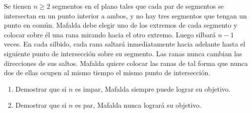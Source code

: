 Se tienen $n \ge 2$ segmentos en el plano tales que cada par de segmentos se intersectan en un punto interior a ambos, y no hay tres segmentos que tengan un punto en común. Mafalda debe elegir uno de los extremos de cada segmento y colocar sobre él una rana mirando hacia el otro extremo. Luego silbará $n-1$ veces. En cada silbido, cada rana saltará inmediatamente hacia adelante hasta el siguiente punto de intersección sobre su segmento. Las ranas nunca cambian las direcciones de sus saltos. Mafalda quiere colocar las ranas de tal forma que nunca dos de ellas ocupen al mismo tiempo el mismo punto de intersección. 
\begin{enumerate}
	\item Demostrar que si $n$ es impar, Mafalda siempre puede lograr su objetivo.  
	\item Demostrar que si $n$ es par, Mafalda nunca logrará su objetivo.
\end{enumerate}